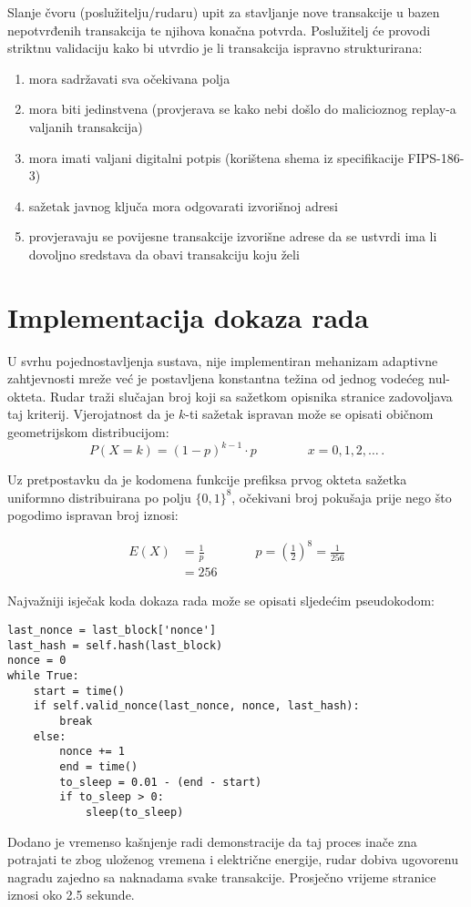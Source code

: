 \documentclass[utf8, zavrsni]{fer}
\begin{document}
Slanje čvoru (poslužitelju/rudaru) upit za stavljanje nove transakcije u bazen nepotvrđenih transakcija te njihova konačna potvrda. Poslužitelj će provodi striktnu validaciju kako bi utvrdio je li transakcija ispravno strukturirana:

\begin{enumerate}
	\item mora sadržavati sva očekivana polja
	\item mora biti jedinstvena (provjerava se kako nebi došlo do malicioznog replay-a valjanih transakcija)
	\item mora imati valjani digitalni potpis (korištena shema iz specifikacije FIPS-186-3)
	\item sažetak javnog ključa mora odgovarati izvorišnoj adresi
	\item provjeravaju se povijesne transakcije izvorišne adrese da se ustvrdi ima li dovoljno sredstava da obavi transakciju koju želi
\end{enumerate}

\section{Implementacija dokaza rada}
U svrhu pojednostavljenja sustava, nije implementiran mehanizam adaptivne zahtjevnosti mreže već je postavljena konstantna težina od jednog vodećeg nul-okteta. Rudar traži slučajan broj koji sa sažetkom opisnika stranice zadovoljava taj kriterij. Vjerojatnost da je $k$-ti sažetak ispravan može se opisati običnom geometrijskom distribucijom:
$$
P(X=k) = (1 - p) ^ {k-1} \cdot p \qquad \qquad x=0,1,2,\ldots \, .
$$

Uz pretpostavku da je kodomena funkcije prefiksa prvog okteta sažetka uniformno distribuirana po polju $\{0,1\} ^{8}$, očekivani broj pokušaja prije nego što pogodimo ispravan broj iznosi:

\begin{equation} \label{eq1}
\begin{split}
E(X) &= \frac{1}{p} \qquad \qquad p = (\frac{1}{2}) ^ {8} = \frac{1}{256} \\
     &= 256
\end{split}
\end{equation}

Najvažniji isječak koda dokaza rada može se opisati sljedećim pseudokodom:

\begin{verbatim}
last_nonce = last_block['nonce']
last_hash = self.hash(last_block)
nonce = 0
while True:
	start = time()
	if self.valid_nonce(last_nonce, nonce, last_hash):
		break
	else:
		nonce += 1
		end = time()
		to_sleep = 0.01 - (end - start)
		if to_sleep > 0:
		    sleep(to_sleep)

\end{verbatim}
Dodano je vremenso kašnjenje radi demonstracije da taj proces inače zna potrajati te zbog uloženog vremena i električne energije, rudar dobiva ugovorenu nagradu zajedno sa naknadama svake transakcije. Prosječno vrijeme stranice iznosi oko 2.5 sekunde.
\end{document}
